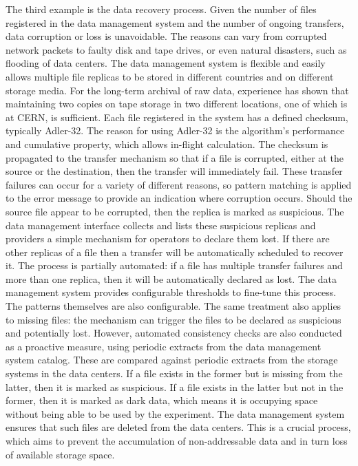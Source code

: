 \documentclass[11pt]{article}
\begin{document}
The third example is the data recovery process. Given the number of files registered in the data management system and the number of ongoing transfers, data corruption or loss is unavoidable. The reasons can vary from corrupted network packets to faulty disk and tape drives, or even natural disasters, such as flooding of data centers. The data management system is flexible and easily allows multiple file replicas to be stored in different countries and on different storage media. For the long-term archival of raw data, experience has shown that maintaining two copies on tape storage in two different locations, one of which is at CERN, is sufficient. Each file registered in the system has a defined checksum, typically Adler-32. The reason for using Adler-32 is the algorithm's performance and cumulative property, which allows in-flight calculation. The checksum is propagated to the transfer mechanism so that if a file is corrupted, either at the source or the destination, then the transfer will immediately fail. These transfer failures can occur for a variety of different reasons, so pattern matching is applied to the error message to provide an indication where corruption occurs. Should the source file appear to be corrupted, then the replica is marked as suspicious. The data management interface collects and lists these suspicious replicas and providers a simple mechanism for operators to declare them lost. If there are other replicas of a file then a transfer will be automatically scheduled to recover it. The process is partially automated: if a file has multiple transfer failures and more than one replica, then it will be automatically declared as lost. The data management system provides configurable thresholds to fine-tune this process. The patterns themselves are also configurable. The same treatment also applies to missing files: the mechanism can trigger the files to be declared as suspicious and potentially lost. However, automated consistency checks are also conducted as a proactive measure, using periodic extracts from the data management system catalog. These are compared against periodic extracts from the storage systems in the data centers. If a file exists in the former but is missing from the latter, then it is marked as suspicious. If a file exists in the latter but not in the former, then it is marked as dark data, which means it is occupying space without being able to be used by the experiment. The data management system ensures that such files are deleted from the data centers. This is a crucial process, which aims to prevent the accumulation of non-addressable data and in turn loss of available storage space.
\end{document}
